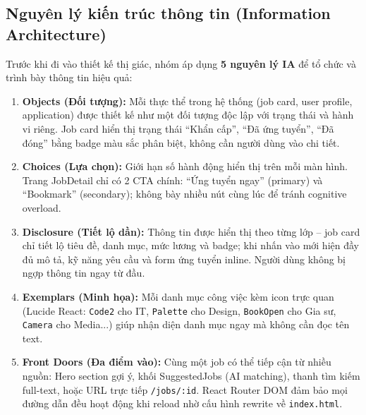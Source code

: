 
\subsection{Nguyên lý kiến trúc thông tin (Information Architecture)}

Trước khi đi vào thiết kế thị giác, nhóm áp dụng \textbf{5 nguyên lý IA} để tổ chức
và trình bày thông tin hiệu quả:

\begin{enumerate}
  \item \textbf{Objects (Đối tượng):} Mỗi thực thể trong hệ thống (job card, user
    profile, application) được thiết kế như một đối tượng độc lập với trạng thái và
    hành vi riêng. Job card hiển thị trạng thái ``Khẩn cấp'', ``Đã ứng tuyển'',
    ``Đã đóng'' bằng badge màu sắc phân biệt, không cần người dùng vào chi tiết.

  \item \textbf{Choices (Lựa chọn):} Giới hạn số hành động hiển thị trên mỗi màn hình.
    Trang JobDetail chỉ có 2 CTA chính: ``Ứng tuyển ngay'' (primary) và
    ``Bookmark'' (secondary); không bày nhiều nút cùng lúc để tránh cognitive overload.

  \item \textbf{Disclosure (Tiết lộ dần):} Thông tin được hiển thị theo từng lớp --
    job card chỉ tiết lộ tiêu đề, danh mục, mức lương và badge; khi nhấn vào mới
    hiện đầy đủ mô tả, kỹ năng yêu cầu và form ứng tuyển inline. Người dùng không
    bị ngợp thông tin ngay từ đầu.

  \item \textbf{Exemplars (Minh họa):} Mỗi danh mục công việc kèm icon trực quan
    (Lucide React: \texttt{Code2} cho IT, \texttt{Palette} cho Design,
    \texttt{BookOpen} cho Gia sư, \texttt{Camera} cho Media...) giúp nhận diện
    danh mục ngay mà không cần đọc tên text.

  \item \textbf{Front Doors (Đa điểm vào):} Cùng một job có thể tiếp cận từ nhiều
    nguồn: Hero section gợi ý, khối SuggestedJobs (AI matching), thanh tìm kiếm
    full-text, hoặc URL trực tiếp \texttt{/jobs/:id}. React Router DOM đảm bảo
    mọi đường dẫn đều hoạt động khi reload nhờ cấu hình rewrite về \texttt{index.html}.
\end{enumerate}

